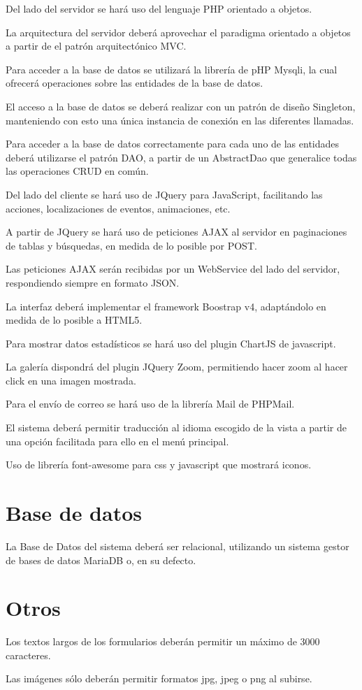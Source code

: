Del lado del servidor se har\'{a} uso del lenguaje PHP orientado a objetos.

La arquitectura del servidor deber\'{a} aprovechar el paradigma orientado a objetos a partir de el patr\'{o}n arquitect\'{o}nico MVC.

Para acceder a la base de datos se utilizar\'{a} la librer\'{i}a de pHP Mysqli, la cual ofrecer\'{a} operaciones sobre las entidades de la base de datos.

El acceso a la base de datos se deber\'{a} realizar con un patr\'{o}n de dise\~{n}o Singleton, manteniendo con esto una \'{u}nica instancia de conexi\'{o}n en las diferentes llamadas.

Para acceder a la base de datos correctamente para cada uno de las entidades deber\'{a} utilizarse el patr\'{o}n DAO, a partir de un AbstractDao que generalice todas las operaciones CRUD en com\'{u}n.

Del lado del cliente se har\'{a} uso de JQuery para JavaScript, facilitando las acciones, localizaciones de eventos, animaciones, etc.

A partir de JQuery se har\'{a} uso de peticiones AJAX al servidor en paginaciones de tablas y b\'{u}squedas, en medida de lo posible por POST.

Las peticiones AJAX ser\'{a}n recibidas por un WebService del lado del servidor, respondiendo siempre en formato JSON.

La interfaz deber\'{a} implementar el framework Boostrap v4, adapt\'{a}ndolo en medida de lo posible a HTML5.

Para mostrar datos estad\'{i}sticos se har\'{a} uso del plugin ChartJS de javascript.

La galer\'{i}a dispondr\'{a} del plugin JQuery Zoom, permitiendo hacer zoom al hacer click en una imagen mostrada.

Para el env\'{i}o de correo se har\'{a} uso de la librer\'{i}a Mail de PHPMail.

El sistema deber\'{a} permitir traducci\'{o}n al idioma escogido de la vista a partir de una opci\'{o}n facilitada para ello en el men\'{u} principal.

Uso de librer\'{i}a font-awesome para css y javascript que mostrar\'{a} iconos.


\section{Base de datos}

La Base de Datos del sistema deber\'{a} ser relacional, utilizando un sistema gestor de bases de datos MariaDB o, en su defecto.


\section{Otros}

Los textos largos de los formularios deber\'{a}n permitir un m\'{a}ximo de 3000 caracteres.

Las im\'{a}genes s\'{o}lo deber\'{a}n permitir formatos jpg, jpeg o png al subirse.

\cleardoublepage